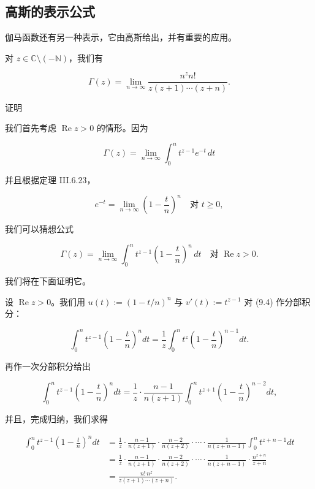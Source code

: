\subsection*{高斯的表示公式}

伽马函数还有另一种表示，它由高斯给出，并有重要的应用。

\begin{theorem}

对 $ z \in \mathbb{C}\setminus(-\mathbb{N}) $，我们有

\[
\Gamma(z) = \lim_{n \to \infty} \frac{n^{z} n!}{z(z+1) \cdots (z+n)} .
\]

证明

\begin{subitems}
\item

我们首先考虑 $ \operatorname{Re} z > 0 $ 的情形。因为

\[
\Gamma(z) = \lim_{n \to \infty} \int_{0}^{n} t^{z-1} e^{-t} \, dt
\]

并且根据定理 III.6.23，

\begin{equation}
e^{-t} = \lim_{n \to \infty} \left( 1 - \frac{t}{n} \right)^{n} \quad \text{对 } t \ge 0 ,\tag{9.3}
\end{equation}

我们可以猜想公式

\begin{equation}
\Gamma(z) = \lim_{n \to \infty} \int_{0}^{n} t^{z-1} \left( 1 - \frac{t}{n} \right)^{n} \, dt \quad \text{对 } \operatorname{Re} z > 0 .\tag{9.4}
\end{equation}

我们将在下面证明它。

\item

设 $ \operatorname{Re} z > 0 $。我们用 $ u(t) := (1 - t/n)^{n} $ 与 $ v'(t) := t^{z-1} $ 对 (9.4) 作分部积分：

\[
\int_{0}^{n} t^{z-1} \left( 1 - \frac{t}{n} \right)^{n} dt = \frac{1}{z} \int_{0}^{n} t^{z} \left( 1 - \frac{t}{n} \right)^{n-1} dt .
\]

再作一次分部积分给出

\[
\int_{0}^{n} t^{z-1} \left( 1 - \frac{t}{n} \right)^{n} dt = \frac{1}{z} \cdot \frac{n-1}{n(z+1)} \int_{0}^{n} t^{z+1} \left( 1 - \frac{t}{n} \right)^{n-2} dt ,
\]

并且，完成归纳，我们求得

\begin{equation*}
\begin{aligned}
\int_{0}^{n} t^{z-1} \left( 1 - \frac{t}{n} \right)^{n} dt &= \frac{1}{z} \cdot \frac{n-1}{n(z+1)} \cdot \frac{n-2}{n(z+2)} \cdot \cdots \cdot \frac{1}{n(z+n-1)} \int_{0}^{n} t^{z+n-1} dt \\ &= \frac{1}{z} \cdot \frac{n-1}{n(z+1)} \cdot \frac{n-2}{n(z+2)} \cdot \cdots \cdot \frac{1}{n(z+n-1)} \cdot \frac{n^{z+n}}{z+n} \\ &= \frac{n! \, n^{z}}{z(z+1) \cdots (z+n)} .
\end{aligned}
\end{equation*}


\end{subitems}
\end{theorem}
